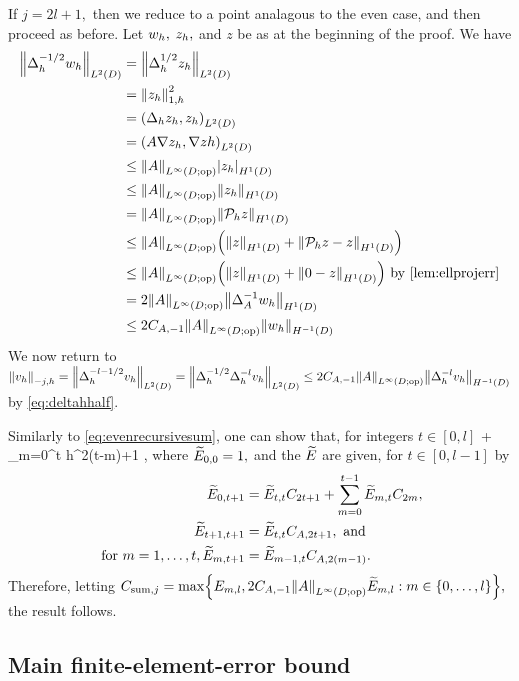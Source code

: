 If $j=2l+1,$ then we reduce to a point analagous to the even case, and then proceed as before. Let $w_{h},$ $z_{h},$ and $z$ be as at the beginning of the proof. We have
\begin{align}
\NLtD{\Deltah^{-1/2}\wh} &= \NLtD{\Deltah^{1/2} \zh}\nonumber\\
&= \Noh{\zh}^2\nonumber\\
&= \IPLtD{\Deltah \zh}{\zh}\\
&= \IPLtD{A \grad \zh}{\grad zh}\nonumber\\
&\leq \NLiDop{A} \SNHoD{\zh}\nonumber\\
&\leq \NLiDop{A} \NHoD{\zh}\nonumber\\
&= \NLiDop{A} \NHoD{\Ph z}\nonumber\\
&\leq \NLiDop{A}\mleft(\NHoD{z} + \NHoD{\Ph z - z}\mright)\nonumber\\
&\leq \NLiDop{A}\mleft(\NHoD{z} + \NHoD{0 - z}\mright) \text{ by \cref{lem:ellprojerr}}\nonumber\\
&= 2\NLiDop{A}\NHoD{\DeltaAI \wh}\nonumber\\
&\leq 2\CAmo \NLiDop{A} \NHmoD{\wh}\label{eq:deltahhalf}
\end{align}
We now return to $\Nmjh{\vh} = \NLtD{\Deltah^{-l-1/2} \vh} = \NLtD{\Deltah^{-1/2} \Deltah^{-l} \vh} \leq 2\CAmo \NLiDop{A} \NHmoD{\Deltah^{-l} \vh}$ by \cref{eq:deltahhalf}.

Similarly to \cref{eq:evenrecursivesum}, one can show that, for integers $t \in [0,l]$
\beqs
{} \leq {}  + \sum_{m=0}^t h^{2(t-m)+1}  ,
\eeqs
where $\widetilde{E}_{0,0} = 1,$ and the $\widetilde{E}_{}$ are given, for $t \in [0,l-1]$ by
\begin{align*}
\widetilde{E}_{0,t+1} &= \widetilde{E}_{t,t}C_{2t+1} + \sum_{m=0}^{t-1} \widetilde{E}_{m,t}C_{2m},\\
\widetilde{E}_{t+1,t+1} &= \widetilde{E}_{t,t}C_{A,2t+1},\text{ and }\\
\text{ for } m = 1,\ldots,t, \widetilde{E}_{m,t+1} &= \widetilde{E}_{m-1,t}C_{A,2(m-1)}.
\end{align*}
Therefore, letting $\Csumj = \max\set{\Efn{m,l},2\CAmo\NLiDop{A}\Etildefn{m,l} \st m \in \set{0,\ldots,l}},$ the result follows.
\epf

\subsection{Main finite-element-error bound}\label{sec:fembound}

